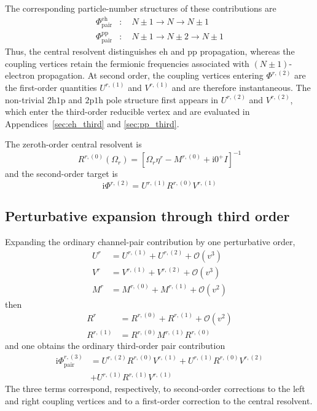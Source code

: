 \documentclass[aip,jcp,reprint,noshowkeys,superscriptaddress]{revtex4-1}
\newcommand{\ii}{\mathrm{i}}
\newcommand{\hhp}{\text{2h1p}}
\newcommand{\pph}{\text{2p1h}}
\newcommand{\eh}{\text{eh}}
\newcommand{\pp}{\text{pp}}
\begin{document}
The corresponding particle-number structures of these contributions are
\begin{align}
	\Phi^\eh_{\mathrm{pair}}
	&:\quad
	N\pm1
	\longrightarrow
	N
	\longrightarrow
	N\pm1
	\label{eq:target_sector_eh}
	\\
	\Phi^\pp_{\mathrm{pair}}
	&:\quad
	N\pm1
	\longrightarrow
	N\pm2
	\longrightarrow
	N\pm1
	\label{eq:target_sector_pp}
\end{align}
Thus, the central resolvent distinguishes $\eh$ and $\pp$ propagation,
whereas the coupling vertices retain the fermionic frequencies associated
with $(N\pm1)$-electron propagation.
At second order, the coupling
vertices entering $\Phi^{r,(2)}$ are the first-order quantities
$U^{r,(1)}$ and $V^{r,(1)}$ and are therefore instantaneous.
The non-trivial $\hhp$ and $\pph$ pole structure first appears in
$U^{r,(2)}$ and $V^{r,(2)}$, which enter the third-order reducible vertex and
are evaluated in Appendices~\ref{sec:eh_third} and \ref{sec:pp_third}.

The zeroth-order central resolvent is
\begin{equation}
	R^{r,(0)}(\Omega_r)
	=
	\left[
	\Omega_r \eta^r - M^{r,(0)} + \ii 0^+ I
	\right]^{-1}
	\label{eq:target_R_zero}
\end{equation}
and the second-order target is
\begin{equation}
	\ii\Phi^{r,(2)}
	=
	U^{r,(1)}
	R^{r,(0)}
	V^{r,(1)}
	\label{eq:target_second_order}
\end{equation}

\subsection{Perturbative expansion through third order}
Expanding the ordinary channel-pair contribution by one perturbative order,
\begin{align}
    U^r
    &=
    U^{r,(1)}+U^{r,(2)}+\mathcal O(v^3)
    \\
    V^r
    &=
    V^{r,(1)}+V^{r,(2)}+\mathcal O(v^3)
    \label{eq:target_UV_expansion}
    \\
    M^r
    &=
    M^{r,(0)}+M^{r,(1)}+\mathcal O(v^2)
    \label{eq:target_M_expansion}
\end{align}
then
\begin{align}
    R^r
    &=
    R^{r,(0)}+R^{r,(1)}+\mathcal O(v^2)
    \\
    R^{r,(1)}
    &=
    R^{r,(0)}M^{r,(1)}R^{r,(0)}
    \label{eq:target_R_first}
\end{align}
and one obtains the ordinary third-order pair contribution
\begin{equation}
    \begin{split}
    \ii\Phi^{r,(3)}_{\mathrm{pair}}
    &=U^{r,(2)}R^{r,(0)}V^{r,(1)}
    +
    U^{r,(1)}R^{r,(0)}V^{r,(2)}
    \\
    &+U^{r,(1)}R^{r,(1)}V^{r,(1)}
    \end{split}
    \label{eq:target_third_order}
\end{equation}
The three terms correspond, respectively, to second-order corrections to the left and right coupling vertices and to a first-order correction to the central resolvent.
\end{document}
